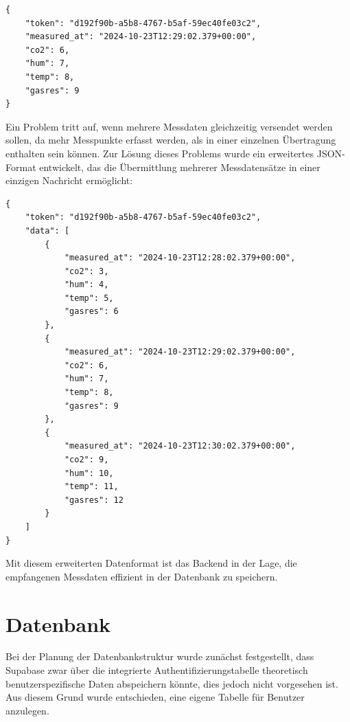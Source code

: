 \begin{inhalt}
\begin{lstlisting}[style=myjson]
{
    "token": "d192f90b-a5b8-4767-b5af-59ec40fe03c2",
    "measured_at": "2024-10-23T12:29:02.379+00:00",
    "co2": 6,
    "hum": 7,
    "temp": 8,
    "gasres": 9
}
\end{lstlisting}

\newpage

Ein Problem tritt auf, wenn mehrere Messdaten gleichzeitig versendet werden sollen, da mehr Messpunkte erfasst werden, als in einer einzelnen Übertragung enthalten sein können. Zur Lösung dieses Problems wurde ein erweitertes JSON-Format entwickelt, das die Übermittlung mehrerer Messdatensätze in einer einzigen Nachricht ermöglicht:

\begin{lstlisting}[style=myjson]
{
    "token": "d192f90b-a5b8-4767-b5af-59ec40fe03c2",
    "data": [
        {
            "measured_at": "2024-10-23T12:28:02.379+00:00",
            "co2": 3,
            "hum": 4,
            "temp": 5,
            "gasres": 6
        },
        {
            "measured_at": "2024-10-23T12:29:02.379+00:00",
            "co2": 6,
            "hum": 7,
            "temp": 8,
            "gasres": 9
        },
        {
            "measured_at": "2024-10-23T12:30:02.379+00:00",
            "co2": 9,
            "hum": 10,
            "temp": 11,
            "gasres": 12
        }
    ]
}
\end{lstlisting}

Mit diesem erweiterten Datenformat ist das Backend in der Lage, die empfangenen Messdaten effizient in der Datenbank zu speichern.

\newpage


\section{Datenbank}

Bei der Planung der Datenbankstruktur wurde zunächst festgestellt, dass Supabase zwar über die integrierte Authentifizierungstabelle theoretisch benutzerspezifische Daten abspeichern könnte, dies jedoch nicht vorgesehen ist. Aus diesem Grund wurde entschieden, eine eigene Tabelle für Benutzer anzulegen.


\end{inhalt}
